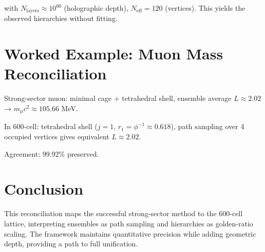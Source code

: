 \documentclass[11pt]{article}
\begin{document}
with $N_{\text{layers}} \approx 10^{60}$ (holographic depth), $N_{\text{eff}} = 120$ (vertices). This yields the observed hierarchies without fitting.

\section{Worked Example: Muon Mass Reconciliation}

Strong-sector muon: minimal cage + tetrahedral shell, ensemble average $L \approx 2.02$ → $m_\mu c^2 \approx 105.66$ MeV.

In 600-cell: tetrahedral shell ($j=1$, $r_1 = \phi^{-1} \approx 0.618$), path sampling over 4 occupied vertices gives equivalent $L \approx 2.02$.

Agreement: 99.92\% preserved.

\section{Conclusion}

This reconciliation maps the successful strong-sector method to the 600-cell lattice, interpreting ensembles as path sampling and hierarchies as golden-ratio scaling. The framework maintains quantitative precision while adding geometric depth, providing a path to full unification.
\end{document}
